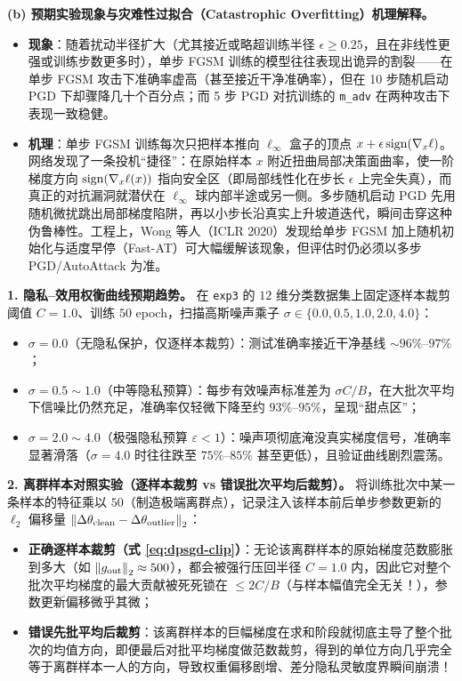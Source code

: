 \textbf{(b) 预期实验现象与灾难性过拟合（Catastrophic Overfitting）机理解释。}
\begin{itemize}
  \item \textbf{现象}：随着扰动半径扩大（尤其接近或略超训练半径 $\epsilon \ge 0.25$，且在非线性更强或训练步数更多时），单步 FGSM 训练的模型往往表现出诡异的割裂——在单步 FGSM 攻击下准确率虚高（甚至接近干净准确率），但在 10 步随机启动 PGD 下却骤降几十个百分点；而 5 步 PGD 对抗训练的 \texttt{m\_adv} 在两种攻击下表现一致稳健。
  \item \textbf{机理}：单步 FGSM 训练每次只把样本推向 $\ell_\infty$ 盒子的顶点 $x + \epsilon\operatorname{sign}(\nabla_x\ell)$。网络发现了一条投机“捷径”：在原始样本 $x$ 附近扭曲局部决策面曲率，使一阶梯度方向 $\operatorname{sign}(\nabla_x\ell(x))$ 指向安全区（即局部线性化在步长 $\epsilon$ 上完全失真），而真正的对抗漏洞就潜伏在 $\ell_\infty$ 球内部半途或另一侧。多步随机启动 PGD 先用随机微扰跳出局部梯度陷阱，再以小步长沿真实上升坡道迭代，瞬间击穿这种伪鲁棒性。工程上，Wong 等人（ICLR 2020）发现给单步 FGSM 加上随机初始化与适度早停（Fast-AT）可大幅缓解该现象，但评估时仍必须以多步 PGD/AutoAttack 为准。
\end{itemize}


\textbf{1. 隐私--效用权衡曲线预期趋势。}
在 \texttt{exp3} 的 $12$ 维分类数据集上固定逐样本裁剪阈值 $C = 1.0$、训练 $50$ epoch，扫描高斯噪声乘子 $\sigma \in \{0.0, 0.5, 1.0, 2.0, 4.0\}$：
\begin{itemize}
  \item $\sigma = 0.0$（无隐私保护，仅逐样本裁剪）：测试准确率接近干净基线 $\sim 96\%\text{--}97\%$；
  \item $\sigma = 0.5 \sim 1.0$（中等隐私预算）：每步有效噪声标准差为 $\sigma C / B$，在大批次平均下信噪比仍然充足，准确率仅轻微下降至约 $93\%\text{--}95\%$，呈现“甜点区”；
  \item $\sigma = 2.0 \sim 4.0$（极强隐私预算 $\varepsilon < 1$）：噪声项彻底淹没真实梯度信号，准确率显著滑落（$\sigma = 4.0$ 时往往跌至 $75\%\text{--}85\%$ 甚至更低），且验证曲线剧烈震荡。
\end{itemize}

\textbf{2. 离群样本对照实验（逐样本裁剪 vs 错误批次平均后裁剪）。}
将训练批次中某一条样本的特征乘以 $50$（制造极端离群点），记录注入该样本前后单步参数更新的 $\ell_2$ 偏移量 $\left\|\Delta\theta_{\text{clean}} - \Delta\theta_{\text{outlier}}\right\|_2$：
\begin{itemize}
  \item \textbf{正确逐样本裁剪（式 \eqref{eq:dpsgd-clip}）}：无论该离群样本的原始梯度范数膨胀到多大（如 $\left\|g_{\text{out}}\right\|_2 \approx 500$），都会被强行压回半径 $C = 1.0$ 内，因此它对整个批次平均梯度的最大贡献被死死锁在 $\le 2C/B$（与样本幅值完全无关！），参数更新偏移微乎其微；
  \item \textbf{错误先批平均后裁剪}：该离群样本的巨幅梯度在求和阶段就彻底主导了整个批次的均值方向，即便最后对批平均梯度做范数裁剪，得到的单位方向几乎完全等于离群样本一人的方向，导致权重偏移剧增、差分隐私灵敏度界瞬间崩溃！
\end{itemize}

